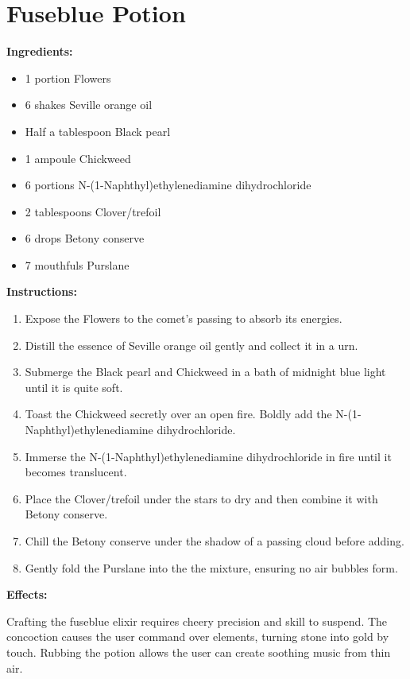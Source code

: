 \documentclass{article}
\begin{document}
\newpage
\section*{Fuseblue Potion}

\textbf{Ingredients:}

\begin{itemize}
  \item 1 portion Flowers
  \item 6 shakes Seville orange oil
  \item Half a tablespoon Black pearl
  \item 1 ampoule Chickweed
  \item 6 portions N-(1-Naphthyl)ethylenediamine dihydrochloride
  \item 2 tablespoons Clover/trefoil
  \item 6 drops Betony conserve
  \item 7 mouthfuls Purslane
\end{itemize}

\textbf{Instructions:}

\begin{enumerate}
  \item Expose the Flowers to the comet’s passing to absorb its energies.
  \item Distill the essence of Seville orange oil gently and collect it in a urn.
  \item Submerge the Black pearl and Chickweed in a bath of midnight blue light until it is quite soft.
  \item Toast the Chickweed secretly over an open fire. Boldly add the N-(1-Naphthyl)ethylenediamine dihydrochloride.
  \item Immerse the N-(1-Naphthyl)ethylenediamine dihydrochloride in fire until it becomes translucent.
  \item Place the Clover/trefoil under the stars to dry and then combine it with Betony conserve.
  \item Chill the Betony conserve under the shadow of a passing cloud before adding.
  \item Gently fold the Purslane into the the mixture, ensuring no air bubbles form.
\end{enumerate}

\textbf{Effects:}

Crafting the fuseblue elixir requires cheery precision and skill to suspend. The concoction causes the user command over elements, turning stone into gold by touch. Rubbing the potion allows the user can create soothing music from thin air.
\end{document}
